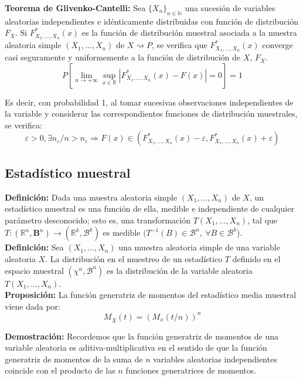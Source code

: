 \documentclass{article}
\begin{document}
\textbf{Teorema de Glivenko-Cantelli:} Sea $\{X_n\}_{n\in\mathbb{N}}$ una sucesión de variables aleatorias independientes e idénticamente distribuidas con función de distribución $F_X$. Si $F_{X_1,\ldots,X_n}^*(x)$ es la función de distribución muestral asociada a la muestra aleatoria simple $(X_1,\ldots,X_n)$ de $X\rightsquigarrow P$, se verifica que $F_{X_1,\ldots,X_n}^*(x)$ converge casi seguramente y uniformemente a la función de distribución de $X$, $F_X$.
\begin{equation*}
P\left[\lim_{n\to +\infty} \sup_{x\in\mathbb{R}}|F_{X_1,\ldots,X_n}^*(x)-F(x)|=0\right]=1
\end{equation*}

Es decir, con probabilidad 1, al tomar sucesivas observaciones independientes de la variable y considerar las correspondientes funciones de distribución muestrales, se verifica:
\begin{equation*}
\varepsilon > 0,\exists n_\varepsilon / n>n_\varepsilon \Rightarrow F(x)\in (F_{X_1,\ldots,X_n}^*(x)-\varepsilon, F_{X_1,\ldots,X_n}^*(x)+\varepsilon)
\end{equation*}

\subsection{Estadístico muestral}
\textbf{Definición:} Dada una muestra aleatoria simple $(X_1,\ldots,X_n)$ de $X$, un estadístico muestral es una función de ella, medible e independiente de cualquier parámetro desconocido; esto es, una transformación $T(X_1,\ldots,X_n)$, tal que $T:(\mathbb{R}^n,\mathbf{B}^n)\rightarrow (\mathbb{R}^k,\mathcal{B}^k)$ es medible $(T^{-1}(B)\in \mathcal{B}^n,\:\forall B\in \mathcal{B}^k$).\\

\textbf{Definición:} Sea $(X_1,\ldots,X_n)$ una muestra aleatoria simple de una variable aleatoria $X$. La distribución en el muestreo de un estadístico $T$ definido en el espacio muestral $(\chi^n,\mathcal{B}^n)$ es la distribución de la variable aleatoria $T(X_1,\ldots,X_n)$.\\

\textbf{Proposición:} La función generatriz de momentos del estadístico media muestral viene dada por:
\begin{equation*}
M_{\overline{X}}(t)=(M_x(t/n))^n
\end{equation*}

\textbf{Demostración:} Recordemos que la función generatriz de momentos de una variable aleatoria es aditiva-multiplicativa en el sentido de que la función generatriz de momentos de la suma de $n$ variables aleatorias independientes coincide con el producto de las $n$ funciones generatrices de momentos.
\end{document}
